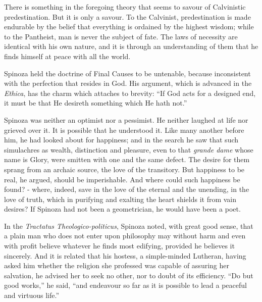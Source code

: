 \documentclass[]{book}
\begin{document}
There is something in the foregoing theory that seems to savour of
Calvinistic predestination. But it is only a savour. To the Calvinist,
predestination is made endurable by the belief that everything is
ordained by the highest wisdom; while to the Pantheist, man is never the
subject of fate. The laws of necessity are identical with his own
nature, and it is through an understanding of them that he finds himself
at peace with all the world.

Spinoza held the doctrine of Final Causes to be untenable, because
inconsistent with the perfection that resides in God. His argument,
which is advanced in the \emph{Ethica}, has the charm which attaches to
brevity: ``If God acts for a designed end, it must be that He desireth
something which He hath not.''

Spinoza was neither an optimist nor a pessimist. He neither laughed at
life nor grieved over it. It is possible that he understood it. Like
many another before him, he had looked about for happiness; and in the
search he saw that such simulachres as wealth, distinction and pleasure,
even to that \emph{grande dame} whose name is Glory, were smitten with
one and the same defect. The desire for them sprang from an archaic
source, the love of the transitory. But happiness to be real, he argued,
should be imperishable. And where could such happiness be found? -
where, indeed, save in the love of the eternal and the unending, in the
love of truth, which in purifying and exalting the heart shields it from
vain desires? If Spinoza had not been a geometrician, he would have been
a poet.

In the \emph{Tractatus Theologico-politicus}, Spinoza noted, with great
good sense, that a plain man who does not enter upon philosophy may
without harm and even with profit believe whatever he finds most
edifying, provided he believes it sincerely. And it is related that his
hostess, a simple-minded Lutheran, having asked him whether the religion
she professed was capable of assuring her salvation, he advised her to
seek no other, nor to doubt of its efficiency. ``Do but good works,'' he
said, ``and endeavour so far as it is possible to lead a peaceful and
virtuous life.''
\end{document}
